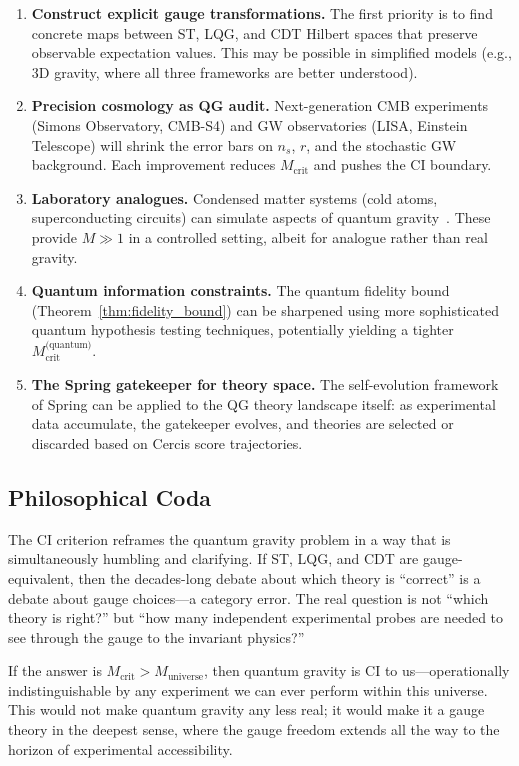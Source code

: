 \documentclass[12pt,a4paper]{article}
\theoremstyle{remark}
\newcommand{\Spring}{\textsf{Spring}}
\newcommand{\Cercis}{\textsf{Cercis}}
\newcommand{\CI}{\textsf{CI}}
\begin{document}
\begin{enumerate}[leftmargin=*, label=(\arabic*)]
  \item \textbf{Construct explicit gauge transformations.} The first priority is to find concrete maps between ST, LQG, and CDT Hilbert spaces that preserve observable expectation values. This may be possible in simplified models (e.g., 3D gravity, where all three frameworks are better understood).
  \item \textbf{Precision cosmology as QG audit.} Next-generation CMB experiments (Simons Observatory, CMB-S4) and GW observatories (LISA, Einstein Telescope) will shrink the error bars on $n_s$, $r$, and the stochastic GW background. Each improvement reduces $M_{\text{crit}}$ and pushes the \CI{} boundary.
  \item \textbf{Laboratory analogues.} Condensed matter systems (cold atoms, superconducting circuits) can simulate aspects of quantum gravity~\cite{bravetti2015analogue}. These provide $M \gg 1$ in a controlled setting, albeit for analogue rather than real gravity.
  \item \textbf{Quantum information constraints.} The quantum fidelity bound (Theorem~\ref{thm:fidelity_bound}) can be sharpened using more sophisticated quantum hypothesis testing techniques, potentially yielding a tighter $M_{\text{crit}}^{\text{(quantum)}}$.
  \item \textbf{The \Spring{} gatekeeper for theory space.} The self-evolution framework of \Spring{} can be applied to the QG theory landscape itself: as experimental data accumulate, the gatekeeper evolves, and theories are selected or discarded based on \Cercis{} score trajectories.
\end{enumerate}

\subsection{Philosophical Coda}

The \CI{} criterion reframes the quantum gravity problem in a way that is simultaneously humbling and clarifying. If ST, LQG, and CDT are gauge-equivalent, then the decades-long debate about which theory is ``correct'' is a debate about gauge choices---a category error. The real question is not ``which theory is right?'' but ``how many independent experimental probes are needed to see through the gauge to the invariant physics?''

If the answer is $M_{\text{crit}} > M_{\text{universe}}$, then quantum gravity is \CI{} to us---operationally indistinguishable by any experiment we can ever perform within this universe. This would not make quantum gravity any less real; it would make it a gauge theory in the deepest sense, where the gauge freedom extends all the way to the horizon of experimental accessibility.
\end{document}
